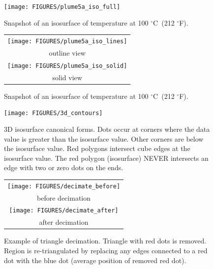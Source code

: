 \documentclass[11pt,twoside]{book}
\newcommand{\degF}{$^\circ$F}
\newcommand{\degC}{$^\circ$C}
\newcommand{\figoptions}{htp}
\begin{document}
\begin{figure}[\figoptions]
\begin{center}
\texttt{[image: FIGURES/plume5a\_iso\_full]}\\
\end{center}
\caption{Snapshot of an isosurface of temperature at 100 \degC\ (212 \degF).
  }
\label{figisoa}%
\end{figure}

\begin{figure}[\figoptions]
\begin{center}
\begin{tabular}{c}
\texttt{[image: FIGURES/plume5a\_iso\_lines]}\\
outline view\\
\texttt{[image: FIGURES/plume5a\_iso\_solid]}\\
solid view
\end{tabular}
\end{center}
\caption{Snapshot of an isosurface of temperature at 100 \degC\ (212 \degF).
  }
\label{figisob}%
\end{figure}

\begin{figure}[\figoptions]
\begin{center}
\texttt{[image: FIGURES/3d\_contours]}
\end{center}
\caption[3D isosurface canonical forms.]{3D isosurface canonical forms.
Dots occur at corners where the data value is greater than the isosurface value.  Other corners are below the isosurface value.  Red polygons intersect cube edges at the isosurface value.  The red polygon (isosurface) NEVER intersects an edge with two or zero dots on the ends.
  }
\label{figisosetup}%
\end{figure}


\begin{figure}[\figoptions]
\begin{center}
\begin{tabular}{c}
\texttt{[image: FIGURES/decimate\_before]}\\
before decimation\\
\texttt{[image: FIGURES/decimate\_after]}\\
after decimation
\end{tabular}
\end{center}
\caption[Example of triangle decimation.]{Example of triangle decimation.  Triangle with red dots is removed.  Region is re-triangulated by replacing any edges connected to a red dot with the blue dot (average position of removed red dot).}
\label{figdecimate}%
\end{figure}
\end{document}
